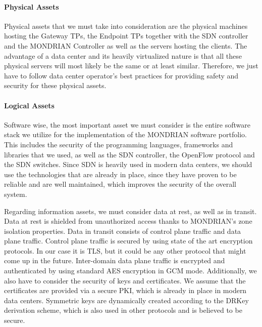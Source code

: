 \paragraph{Physical Assets}
Physical assets that we must take into consideration are the physical machines hosting the Gateway \acsp{TP}, the Endpoint \acsp{TP} together with the \acs{SDN} controller and the MONDRIAN Controller as well as the servers hosting the clients. The advantage of a data center and its heavily virtualized nature is that all these physical servers will most likely be the same or at least similar. Therefore, we just have to follow data center operator's best practices for providing safety and security for these physical assets. 
\paragraph{Logical Assets}
Software wise, the most important asset we must consider is the entire software stack we utilize for the implementation of the MONDRIAN software portfolio. This includes the security of the programming languages, frameworks and libraries that we used, as well as the \acs{SDN} controller, the OpenFlow protocol and the \acs{SDN} switches. Since \acs{SDN} is heavily used in modern data centers, we should use the technologies that are already in place, since they have proven to be reliable and are well maintained, which improves the security of the overall system.

Regarding information assets, we must consider data at rest, as well as in transit. Data at rest is shielded from unauthorized access thanks to MONDRIAN's zone isolation properties. Data in transit consists of control plane traffic and data plane traffic. Control plane traffic is secured by using state of the art encryption protocols. In our case it is \acs{TLS}, but it could be any other protocol that might come up in the future. Inter-domain data plane traffic is encrypted and authenticated by using standard \acs{AES} encryption in \acs{GCM} mode. Additionally, we also have to consider the security of keys and certificates. We assume that the certificates are provided via a secure \acs{PKI}, which is already in place in modern data centers. Symmetric keys are dynamically created according to the \acs{DRKey} derivation scheme, which is also used in other protocols and is believed to be secure.
